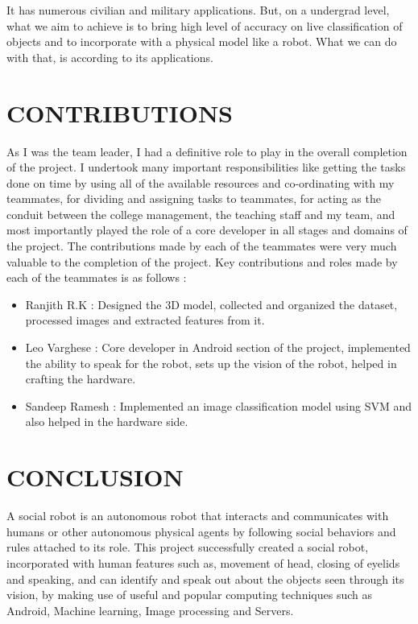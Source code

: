 \documentclass{fisatproject}
\begin{document}
It has numerous civilian and military applications. But, on a undergrad level, what we aim to achieve is to bring high level of accuracy on live classification of objects and to incorporate with a physical model like a robot. What we can do with that, is according to its applications.

\chapter{CONTRIBUTIONS}
As I was the team leader, I had a definitive role to play in the overall completion of the project. I undertook many important responsibilities like getting the tasks done on time by using all of the available resources and co-ordinating with my teammates, for dividing and assigning tasks to teammates, for acting as the conduit between the college management, the teaching staff and my team, and most importantly played the role of a core developer in all stages and domains of the project.\newline\newline
The contributions made by each of the teammates were very much valuable to the completion of the project. Key contributions and roles made by each of the teammates is as follows :\newline
\begin{itemize}
	\item Ranjith R.K : Designed the 3D model, collected and organized the dataset, processed images and extracted features from it.
	\item Leo Varghese : Core developer in Android section of the project, implemented the ability to speak for the robot, sets up the vision of the robot, helped in crafting the hardware.
	\item Sandeep Ramesh : Implemented an image classification model using SVM and also helped in the hardware side.
\end{itemize}

\chapter{CONCLUSION}
A social robot is an autonomous robot that interacts and communicates with
humans or other autonomous physical agents by following social behaviors and
rules attached to its role.
This project successfully created a social robot, incorporated with human features such as, movement of head, closing of eyelids and speaking, and can identify and speak out about the objects seen through its vision, by making use of useful and popular computing techniques such as Android, Machine learning, Image processing and Servers.
\end{document}
